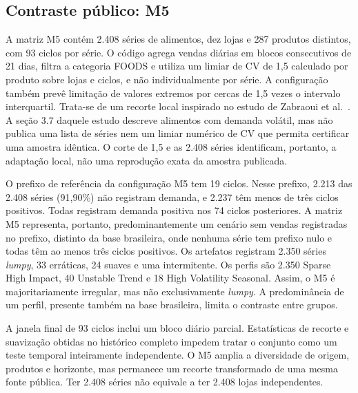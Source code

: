 \documentclass[preprint,12pt]{elsarticle}
\begin{document}
\subsection{Contraste público: M5}
A matriz M5 contém 2.408 séries de alimentos, dez lojas e 287 produtos distintos, com 93 ciclos por série. O código agrega vendas diárias em blocos consecutivos de 21 dias, filtra a categoria FOODS e utiliza um limiar de CV de 1,5 calculado por produto sobre lojas e ciclos, e não individualmente por série. A configuração também prevê limitação de valores extremos por cercas de 1,5 vezes o intervalo interquartil. Trata-se de um recorte local inspirado no estudo de Zabraoui et al.\ \cite{sca_27e994c54848}. A seção 3.7 daquele estudo descreve alimentos com demanda volátil, mas não publica uma lista de séries nem um limiar numérico de CV que permita certificar uma amostra idêntica. O corte de 1,5 e as 2.408 séries identificam, portanto, a adaptação local, não uma reprodução exata da amostra publicada.

O prefixo de referência da configuração M5 tem 19 ciclos. Nesse prefixo, 2.213 das 2.408 séries (91,90\%) não registram demanda, e 2.237 têm menos de três ciclos positivos. Todas registram demanda positiva nos 74 ciclos posteriores. A matriz M5 representa, portanto, predominantemente um cenário sem vendas registradas no prefixo, distinto da base brasileira, onde nenhuma série tem prefixo nulo e todas têm ao menos três ciclos positivos. Os artefatos registram 2.350 séries \textit{lumpy}, 33 erráticas, 24 suaves e uma intermitente. Os perfis são 2.350 Sparse High Impact, 40 Unstable Trend e 18 High Volatility Seasonal. Assim, o M5 é majoritariamente irregular, mas não exclusivamente \textit{lumpy}. A predominância de um perfil, presente também na base brasileira, limita o contraste entre grupos.

A janela final de 93 ciclos inclui um bloco diário parcial. Estatísticas de recorte e suavização obtidas no histórico completo impedem tratar o conjunto como um teste temporal inteiramente independente. O M5 amplia a diversidade de origem, produtos e horizonte, mas permanece um recorte transformado de uma mesma fonte pública. Ter 2.408 séries não equivale a ter 2.408 lojas independentes.
\end{document}
